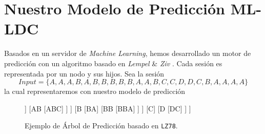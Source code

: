 


\section{Nuestro Modelo de Predicción ML-LDC}\label{sec:nuestromodelopredict-mlldc}






Basados en un servidor de \emph{Machine Learning}, hemos desarrollado un motor de predicción con un algoritmo basado en \emph{Lempel} \& \emph{Ziv} \cite{ZivLempel1977}. Cada sesión es representada por un nodo y sus hijos. Sea la sesión \begin{equation}
Input = \{ A,A,A,B,A,B,B,B,B,B,A,A,B,C,C,D,D,C,B,A,A,A,A \}
\end{equation} la cual representaremos con nuestro modelo de predicción



\begin{figure}[h] 
	\centering
	\begin{forest} 
	[ $\epsilon$
		[A
			[AA
				[AAA]	
			]
			[AB
				[ABC]
			]
		]
		[B
			[BA]
			[BB
				[BBA]
			]
		]
		[C]
		[D
			[DC]
		]
	]
	\end{forest}
	\caption{Ejemplo de Árbol de Predicción basado en \texttt{LZ78}.}
	\label{fig:lztrie1}
\end{figure}

